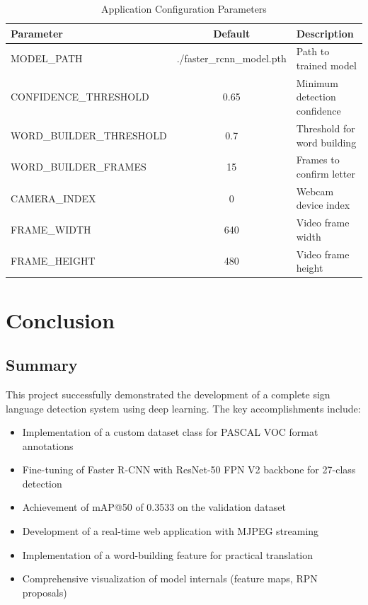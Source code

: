 \documentclass[12pt,a4paper]{article}
\begin{document}
\begin{table}[H]
    \centering
    \caption{Application Configuration Parameters}
    \label{tab:app_config}
    \begin{tabular}{|l|c|p{5cm}|}
        \hline
        \textbf{Parameter} & \textbf{Default} & \textbf{Description} \\
        \hline
        MODEL\_PATH & ./faster\_rcnn\_model.pth & Path to trained model \\
        CONFIDENCE\_THRESHOLD & 0.65 & Minimum detection confidence \\
        WORD\_BUILDER\_THRESHOLD & 0.7 & Threshold for word building \\
        WORD\_BUILDER\_FRAMES & 15 & Frames to confirm letter \\
        CAMERA\_INDEX & 0 & Webcam device index \\
        FRAME\_WIDTH & 640 & Video frame width \\
        FRAME\_HEIGHT & 480 & Video frame height \\
        \hline
    \end{tabular}
\end{table}

\section{Conclusion}

\subsection{Summary}

This project successfully demonstrated the development of a complete sign language detection system using deep learning. The key accomplishments include:

\begin{itemize}
    \item Implementation of a custom dataset class for PASCAL VOC format annotations
    \item Fine-tuning of Faster R-CNN with ResNet-50 FPN V2 backbone for 27-class detection
    \item Achievement of mAP@50 of 0.3533 on the validation dataset
    \item Development of a real-time web application with MJPEG streaming
    \item Implementation of a word-building feature for practical translation
    \item Comprehensive visualization of model internals (feature maps, RPN proposals)
\end{itemize}
\end{document}

